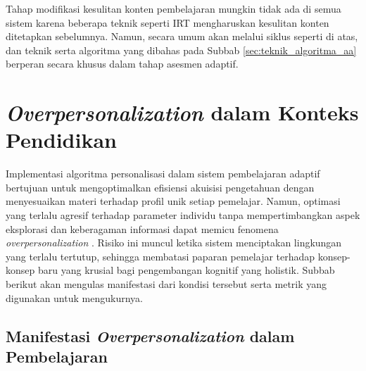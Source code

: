 Tahap modifikasi kesulitan konten pembelajaran mungkin tidak ada di semua sistem
karena beberapa teknik seperti IRT mengharuskan kesulitan konten ditetapkan sebelumnya.
Namun, secara umum akan melalui siklus seperti di atas, dan teknik serta algoritma
yang dibahas pada Subbab \ref{sec:teknik_algoritma_aa} berperan secara khusus dalam tahap asesmen adaptif.


\section{\textit{Overpersonalization} dalam Konteks Pendidikan}
\label{sec:overpersonalization_dalam_pendidikan}

Implementasi algoritma personalisasi dalam sistem pembelajaran adaptif bertujuan untuk mengoptimalkan efisiensi akuisisi pengetahuan dengan menyesuaikan materi terhadap profil unik setiap pemelajar. Namun, optimasi yang terlalu agresif terhadap parameter individu tanpa mempertimbangkan aspek eksplorasi dan keberagaman informasi dapat memicu fenomena \textit{overpersonalization} \autocite{Halkiopoulos2024}. Risiko ini muncul ketika sistem menciptakan lingkungan yang terlalu tertutup, sehingga membatasi paparan pemelajar terhadap konsep-konsep baru yang krusial bagi pengembangan kognitif yang holistik. Subbab berikut akan mengulas manifestasi dari kondisi tersebut serta metrik yang digunakan untuk mengukurnya.

\subsection{Manifestasi \textit{Overpersonalization} dalam Pembelajaran}

